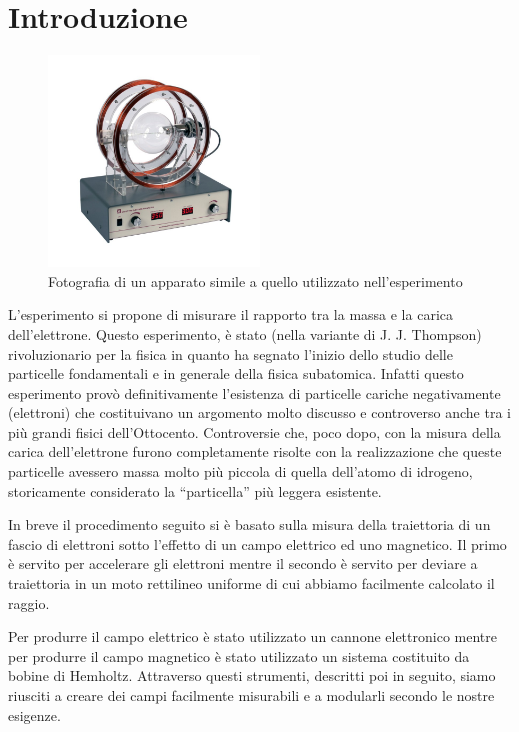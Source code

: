 \documentclass[a4paper,11pt]{article}
\newcommand{\virgolette}[1]{``#1''}
\begin{document}
	\section{Introduzione}
	\begin{figure}
		\centering
		\vspace{-0.5cm}
		\includegraphics[width=0.5\textwidth]{apparatus}
		
		\label{apparato}
		\caption{Fotografia di un apparato simile a quello utilizzato nell'esperimento}
	\end{figure}
	L'esperimento si propone di misurare il rapporto tra la massa e la carica dell'elettrone. Questo esperimento, è stato (nella variante di J. J. Thompson) rivoluzionario per la fisica in quanto ha segnato l'inizio dello studio delle particelle fondamentali e in generale della fisica subatomica. Infatti questo esperimento provò definitivamente l'esistenza di particelle cariche negativamente (elettroni) che costituivano un argomento molto discusso e controverso anche tra i più grandi fisici dell'Ottocento. Controversie che, poco dopo, con la misura della carica dell'elettrone furono completamente risolte con la realizzazione che queste particelle avessero massa molto più piccola di quella dell'atomo di idrogeno, storicamente considerato la \virgolette{particella} più leggera esistente.
	
	In breve il procedimento seguito si è basato sulla misura della traiettoria di un fascio di elettroni sotto l'effetto di un campo elettrico ed uno magnetico. Il primo è servito per accelerare gli elettroni mentre il secondo è servito per deviare a traiettoria in un moto rettilineo uniforme di cui abbiamo facilmente calcolato il raggio.
	
	Per produrre il campo elettrico è stato utilizzato un cannone elettronico mentre per produrre il campo magnetico è stato utilizzato un sistema costituito da bobine di Hemholtz. Attraverso questi strumenti, descritti poi in seguito, siamo riusciti a creare dei campi facilmente misurabili e a modularli secondo le nostre esigenze.
	
\end{document}
